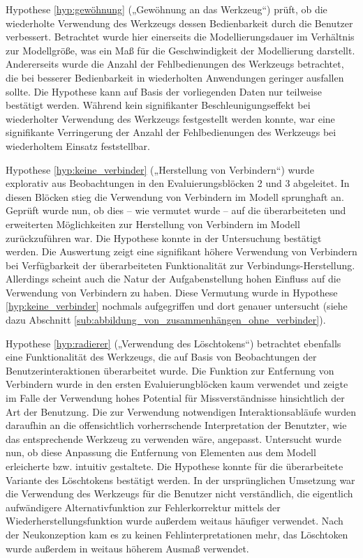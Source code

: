 Hypothese \ref{hyp:gewöhnung} („Gewöhnung an das Werkzeug“) prüft, ob die wiederholte Verwendung des Werkzeugs dessen Bedienbarkeit durch die Benutzer verbessert. Betrachtet wurde hier einerseits die Modellierungsdauer im Verhältnis zur Modellgröße, was ein Maß für die Geschwindigkeit der Modellierung darstellt. Andererseits wurde die Anzahl der Fehlbedienungen des Werkzeugs betrachtet, die bei besserer Bedienbarkeit in wiederholten Anwendungen geringer ausfallen sollte. Die Hypothese kann auf Basis der vorliegenden Daten nur teilweise bestätigt werden. Während kein signifikanter Beschleunigungseffekt bei wiederholter Verwendung des Werkzeugs festgestellt werden konnte, war eine signifikante Verringerung der Anzahl der Fehlbedienungen des Werkzeugs bei wiederholtem Einsatz feststellbar.

Hypothese \ref{hyp:keine_verbinder} („Herstellung von Verbindern“) wurde explorativ aus Beobachtungen in den Evaluierungsblöcken 2 und 3 abgeleitet. In diesen Blöcken stieg die Verwendung von Verbindern im Modell sprunghaft an. Geprüft wurde nun, ob dies -- wie vermutet wurde -- auf die überarbeiteten und erweiterten Möglichkeiten zur Herstellung von Verbindern im Modell zurückzuführen war. Die Hypothese konnte in der Untersuchung bestätigt werden. Die Auswertung zeigt eine signifikant höhere Verwendung von Verbindern bei Verfügbarkeit der überarbeiteten Funktionalität zur Verbindungs-Herstellung. Allerdings scheint auch die Natur der Aufgabenstellung hohen Einfluss auf die Verwendung von Verbindern zu haben. Diese Vermutung wurde in Hypothese \ref{hyp:keine_verbinder} nochmals aufgegriffen und dort genauer untersucht (siehe dazu  Abschnitt \ref{sub:abbildung_von_zusammenhängen_ohne_verbinder}).

Hypothese \ref{hyp:radierer} („Verwendung des Löschtokens“) betrachtet ebenfalls eine Funktionalität des Werkzeugs, die auf Basis von Beobachtungen der Benutzerinteraktionen überarbeitet wurde. Die Funktion zur Entfernung von Verbindern wurde in den ersten Evaluierungblöcken kaum verwendet und zeigte im Falle der Verwendung hohes Potential für Missverständnisse hinsichtlich der Art der Benutzung. Die zur Verwendung notwendigen Interaktionsabläufe wurden daraufhin an die offensichtlich vorherrschende Interpretation der Benutzter, wie das entsprechende Werkzeug zu verwenden wäre, angepasst. Untersucht wurde nun, ob diese Anpassung die Entfernung von Elementen aus dem Modell erleicherte bzw. intuitiv gestaltete. Die Hypothese konnte für die überarbeitete Variante des Löschtokens bestätigt werden. In der ursprünglichen Umsetzung war die Verwendung des Werkzeugs für die Benutzer nicht verständlich, die eigentlich aufwändigere Alternativfunktion zur Fehlerkorrektur mittels der Wiederherstellungsfunktion wurde außerdem weitaus häufiger verwendet. Nach der Neukonzeption kam es zu keinen Fehlinterpretationen mehr, das Löschtoken wurde außerdem in weitaus höherem Ausmaß verwendet.

